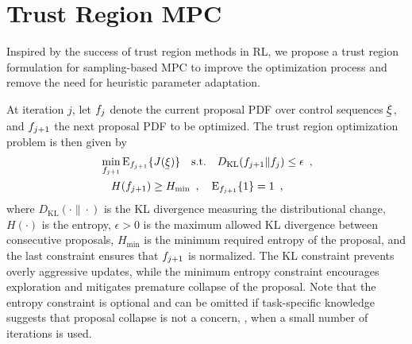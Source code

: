 \section{Trust Region \ac*{MPC}}
\label{sec:tr_mpc}

Inspired by the success of trust region methods in \ac{RL}, we propose a trust region formulation for sampling-based \ac{MPC} to improve the optimization process and remove the need for heuristic parameter adaptation.

At iteration $j$, let $f_j$ denote the current proposal \ac{PDF} over control sequences $\vVarCem$, and $f_{j+1}$ the next proposal \ac{PDF} to be optimized.
The trust region optimization problem is then given by
\begin{align}
    \label{eq:tr_objective_function}
    &\min_{\pdf_{j+1}} \Eop_{\pdf_{j+1}}\{J(\vVarCem)\}
    \quad \text{s.t.} \quad D_{\mathrm{KL}}(\pdf_{j+1} \| \pdf_j) \leq \epsilon \enspace, 
    \\
    &
    \quad H(\pdf_{j+1}) \ge H_{\min} \enspace,
    \quad  \Eop_{\pdf_{j+1}} \{ 1\} = 1 \enspace,
\end{align}
where $D_{\mathrm{KL}}(\cdot \| \cdot)$ is the \ac{KL} divergence measuring the distributional change, $H(\cdot)$ is the entropy, $\epsilon>0$ is the maximum allowed \ac{KL} divergence between consecutive proposals,  $H_{\min}$ is the minimum required entropy of the proposal, and the last constraint ensures that $f_{j+1}$ is normalized.
The \ac{KL} constraint prevents overly aggressive updates, while the minimum entropy constraint encourages exploration and mitigates premature collapse of the proposal.
Note that the entropy constraint is optional and can be omitted if task-specific knowledge suggests that proposal collapse is not a concern, \eg, when a small number of iterations is used.

